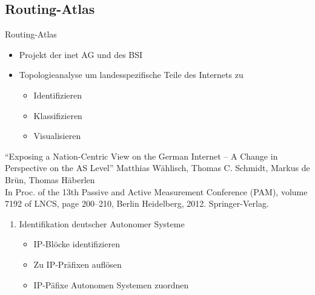\documentclass[ngerman,compress,hyperref={bookmarks}]{beamer}
\begin{document}
\subsection{Routing-Atlas}
\begin{frame}[allowframebreaks]{Routing-Atlas}
\nocite{wsbh-envgi-12}
\nocite{Faloutsos:1999:PRI:316194.316229}
\nocite{Dimitropoulos:2007:RIV:1198255.1198259}
\nocite{0903.3218v1}
  \begin{itemize}
    \item Projekt der inet AG und des BSI
    \item Topologieanalyse um landesspezifische Teile des Internets zu
    \begin{itemize}
      \item Identifizieren
      \item Klassifizieren
      \item Visualisieren
    \end{itemize}
  \end{itemize}
  \vspace{0.1cm}
  {\small
  \begin{thebibliography}{}
     ``Exposing a Nation-Centric View on the German Internet – A Change in Perspective on the AS Level''
    \newblock Matthias Wählisch, Thomas C. Schmidt, Markus de Brün, Thomas Häberlen\\
    \newblock In Proc. of the 13th Passive and Active Measurement Conference (PAM), volume 7192 of LNCS, page 200–210, Berlin Heidelberg, 2012. Springer-Verlag.\\[-20pt]
  \end{thebibliography}
  }
  \framebreak
%
  \begin{enumerate}
  \item Identifikation deutscher Autonomer Systeme
  \begin {itemize}
    \item IP-Blöcke identifizieren
    \item Zu IP-Präfixen auflösen
    \item IP-Päfixe Autonomen Systemen zuordnen
  \end{itemize}

\end{enumerate}
\end{frame}
\end{document}
